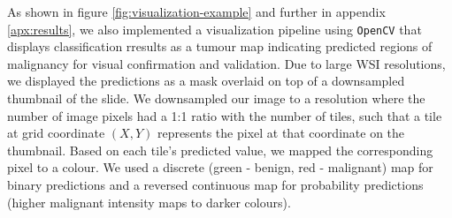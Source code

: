 \documentclass{l4proj}
\begin{document}
As shown in figure \ref{fig:visualization-example} and further in appendix \ref{apx:results}, we also implemented a visualization pipeline using \texttt{OpenCV} that displays classification rresults as a tumour map indicating predicted regions of malignancy for visual confirmation and validation. Due to large WSI resolutions, we displayed the predictions as a mask overlaid on top of a downsampled thumbnail of the slide. We downsampled our image to a resolution where the number of image pixels had a 1:1 ratio with the number of tiles, such that a tile at grid coordinate \((X, Y)\) represents the pixel at that coordinate on the thumbnail. Based on each tile's predicted value, we mapped the corresponding pixel to a colour. We used a discrete (green - benign, red - malignant) map for binary predictions and a reversed continuous map for probability predictions (higher malignant intensity maps to darker colours). 
\end{document}
